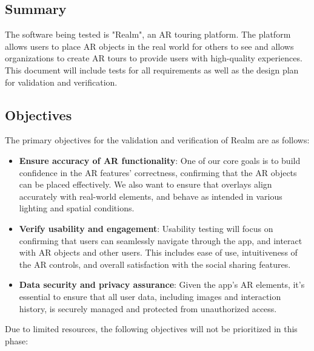 \documentclass[12pt, titlepage]{article}
\begin{document}
\subsection{Summary}

The software being tested is "Realm", an AR touring platform. The platform allows users to place AR objects in the real world for others to see and allows organizations to create AR tours to provide users with high-quality experiences. This document will include tests for all requirements as well as the design plan for validation and verification.

\subsection{Objectives}

The primary objectives for the validation and verification of Realm are as follows: \\

\begin{itemize}
  \item \textbf{Ensure accuracy of AR functionality}: One of our core goals is to build confidence in the AR features' correctness, confirming that the AR objects can be placed effectively. We also want to ensure that overlays align accurately with real-world elements, and behave as intended in various lighting and spatial conditions. \\

  \item \textbf{Verify usability and engagement}: Usability testing will focus on confirming that users can seamlessly navigate through the app, and interact with AR objects and other users. This includes ease of use, intuitiveness of the AR controls, and overall satisfaction with the social sharing features. \\

  \item \textbf{Data security and privacy assurance}: Given the app's AR elements, it's essential to ensure that all user data, including images and interaction history, is securely managed and protected from unauthorized access. \\
\end{itemize}

Due to limited resources, the following objectives will not be prioritized in this phase: \\
\end{document}
